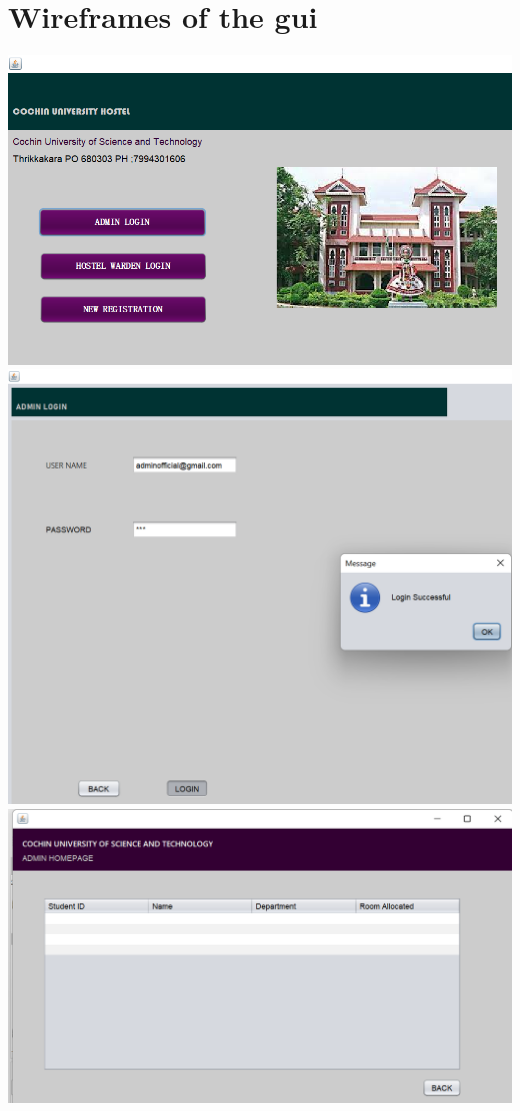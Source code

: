 \documentclass[a4paper,12pt]{report}
\begin{document}
\section{Wireframes of the gui}
\includegraphics[scale=0.3]{mainlogin.png}
\includegraphics[scale=0.3]{adminlogin.png}
\includegraphics[scale=0.3]{record.png'.png}
\end{document}
